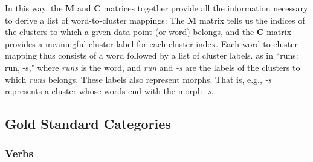In this way, the $\mathbf{M}$ and $\mathbf{C}$ matrices together provide all the information necessary 
to derive a list of word-to-cluster mappings: The $\mathbf{M}$ 
matrix tells us the indices of the clusters to which a given data point (or word) 
belongs, and the $\mathbf{C}$ matrix provides a meaningful cluster label for each 
cluster index. Each word-to-cluster mapping thus 
consists of a word followed by a list of cluster labels.  
as in ``runs: run, -s,"  where \textit{runs} is the word, and \textit{run} and \textit{-s} 
are the labels of the clusters to which \textit{runs} belongs. These labels also represent 
morphs. That is, e.g., \emph{-s} represents a cluster whose words end with the morph 
\emph{-s}. 



\subsection{Gold Standard Categories}

\subsubsection{Verbs} 

